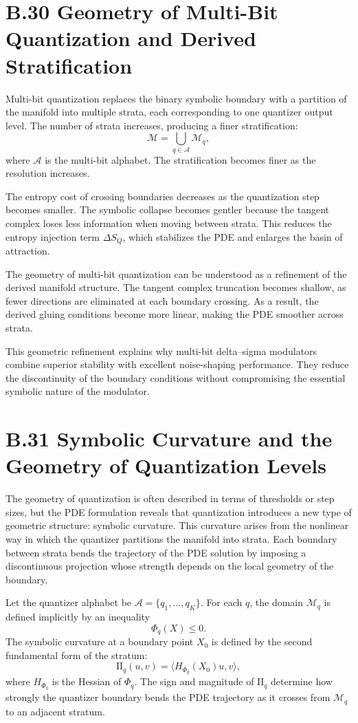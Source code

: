 \section{B.30 Geometry of Multi-Bit Quantization and Derived Stratification}

Multi-bit quantization replaces the binary symbolic boundary with a partition of the manifold into multiple strata, each corresponding to one quantizer output level. The number of strata increases, producing a finer stratification:
\[
\mathcal{M}
= \bigcup_{q \in \mathcal{A}} \mathcal{M}_{q},
\]
where \(\mathcal{A}\) is the multi-bit alphabet. The stratification becomes finer as the resolution increases.

The entropy cost of crossing boundaries decreases as the quantization step becomes smaller. The symbolic collapse becomes gentler because the tangent complex loses less information when moving between strata. This reduces the entropy injection term \(\Delta S_{Q}\), which stabilizes the PDE and enlarges the basin of attraction.

The geometry of multi-bit quantization can be understood as a refinement of the derived manifold structure. The tangent complex truncation becomes shallow, as fewer directions are eliminated at each boundary crossing. As a result, the derived gluing conditions become more linear, making the PDE smoother across strata.

This geometric refinement explains why multi-bit delta–sigma modulators combine superior stability with excellent noise-shaping performance. They reduce the discontinuity of the boundary conditions without compromising the essential symbolic nature of the modulator.

\section{B.31 Symbolic Curvature and the Geometry of Quantization Levels}

The geometry of quantization is often described in terms of thresholds or step sizes, but the PDE formulation reveals that quantization introduces a new type of geometric structure: symbolic curvature. This curvature arises from the nonlinear way in which the quantizer partitions the manifold into strata. Each boundary between strata bends the trajectory of the PDE solution by imposing a discontinuous projection whose strength depends on the local geometry of the boundary.

Let the quantizer alphabet be \(\mathcal{A} = \{q_{1},\ldots,q_{K}\}\). For each \(q\), the domain \(\mathcal{M}_{q}\) is defined implicitly by an inequality
\[
\Phi_{q}(X) \le 0.
\]
The symbolic curvature at a boundary point \(X_{0}\) is defined by the second fundamental form of the stratum:
\[
\mathrm{II}_{q}(u,v)
= \langle H_{\Phi_{q}}(X_{0})u, v \rangle,
\]
where \(H_{\Phi_{q}}\) is the Hessian of \(\Phi_{q}\). The sign and magnitude of \(\mathrm{II}_{q}\) determine how strongly the quantizer boundary bends the PDE trajectory as it crosses from \(\mathcal{M}_{q}\) to an adjacent stratum.

